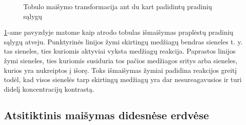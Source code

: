 \begin{figure}[!h]
\caption{Tobulo maišymo transformacija ant du kart padidintų pradinių sąlygų}
\label{perfect-4x4-mix}
\end{figure}

\ref{perfect-4x4-mix}-ame pavyzdyje matome kaip atrodo tobulas išmaišymas praplėstų pradinių sąlygų atveju. Punktyrinės linijos žymi skirtingų medžiagų bendras sieneles t. y. tas sieneles, ties kuriomis aktyviai vyksta medžiagų reakcija. Paprastos linijos žymi sieneles, ties kuriomis susiduria tos pačios medžiagos sritys arba sieneles, kurios yra nukreiptos į išorę. Toks išmaišymas žymiai padidina reakcijos greitį todėl, kad visos sienelės tarp skirtingų medžiagų yra dar nesureagavusios ir turi didelį koncentracijų kontrastą.

\subsection{Atsitiktinis maišymas didesnėse erdvėse}

 





